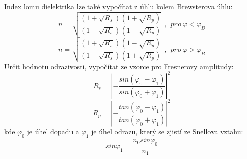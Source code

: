 \documentclass[a4paper,11pt]{article}
\begin{document}
    \begin{minipage}[t]{0.5\textwidth} 
            Index lomu dielektrika lze také vypočítat z úhlu kolem Brewsterova úhlu:
            \begin{equation}
                n = \sqrt{\frac{(1+\sqrt{R_s})(1+\sqrt{R_p})}{(1-\sqrt{R_s})(1-\sqrt{R_p})}} ~~,~~ pro~ \varphi <  \varphi_B
            \end{equation}
            \begin{equation}
                n = \sqrt{\frac{(1+\sqrt{R_s})(1-\sqrt{R_p})}{(1-\sqrt{R_s})(1+\sqrt{R_p})}} ~~,~~ pro~ \varphi >  \varphi_B
            \end{equation}
            Určit hodnotu odrazivosti, vypočítat ze vzorce pro Fresnerovy amplitudy:
            \begin{equation}
                R_s = \left\vert -\frac{sin(\varphi_0 - \varphi_1)}{sin(\varphi_0 + \varphi_1)} \right\vert^2
            \end{equation}
            \begin{equation}
                R_p = \left\vert -\frac{tan(\varphi_0 - \varphi_1)}{tan(\varphi_0 + \varphi_1)} \right\vert^2
            \end{equation}
            kde $\varphi_0$ je úhel dopadu a $\varphi_1$ je úhel odrazu, který se zjistí ze Snellova vztahu:
            \begin{equation}
                sin\varphi_1 = \frac{n_0 sin\varphi_0}{n_1}
            \end{equation}

\end{minipage}
\end{document}
